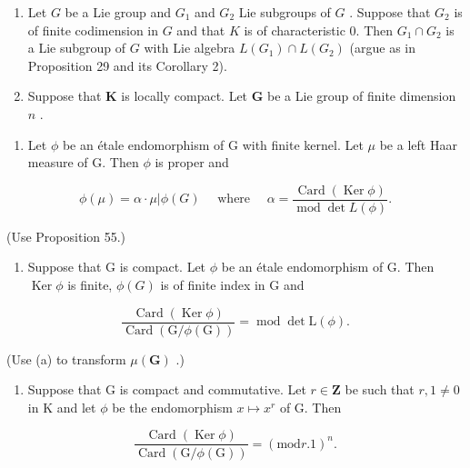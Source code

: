 
\begin{enumerate}
\def\labelenumi{\arabic{enumi}.}
\item
  Let \(G\) be a Lie group and \(G_1\) and \(G_2\) Lie subgroups of \(G\) . Suppose that \(G_2\) is of finite codimension in \(G\) and that \(K\) is of characteristic 0. Then \(G_1 \cap G_2\) is a Lie subgroup of \(G\) with Lie algebra \(L(G_1) \cap L(G_2)\) (argue as in Proposition 29 and its Corollary 2).
\item
  Suppose that \(\mathbf{K}\) is locally compact. Let \(\mathbf{G}\) be a Lie group of finite dimension \(n\) .
\end{enumerate}

\begin{enumerate}
\def\labelenumi{(\alph{enumi})}
\tightlist
\item
  Let \(\phi\) be an étale endomorphism of G with finite kernel. Let \(\mu\) be a left Haar measure of G. Then \(\phi\) is proper and
\end{enumerate}

\[
\phi (\mu) = \alpha \cdot \mu | \phi (G) \quad \text { where } \quad \alpha = \frac {\operatorname{Card} (\operatorname{Ker} \phi)}{\operatorname{mod} \det L (\phi)}.
\]

(Use Proposition 55.)
\relax{}
\begin{enumerate}
\def\labelenumi{(\alph{enumi})}
\setcounter{enumi}{1}
\tightlist
\item
  Suppose that G is compact. Let \(\phi\) be an étale endomorphism of G. Then \(\operatorname{Ker} \phi\) is finite, \(\phi(G)\) is of finite index in G and
\end{enumerate}

\[
\frac {\operatorname{Card} (\operatorname{Ker} \phi)}{\operatorname{Card} (\mathrm{G} / \phi (\mathrm{G}))} = \operatorname{mod} \det \mathrm{L} (\phi).
\]

(Use (a) to transform \(\mu (\mathbf{G})\) .)

\begin{enumerate}
\def\labelenumi{(\alph{enumi})}
\setcounter{enumi}{2}
\tightlist
\item
  Suppose that G is compact and commutative. Let \(r \in \mathbf{Z}\) be such that \(r, 1 \neq 0\) in K and let \(\phi\) be the endomorphism \(x \mapsto x^r\) of G. Then
\end{enumerate}

\[
\frac {\operatorname{Card} (\operatorname{Ker} \phi)}{\operatorname{Card} (\mathrm{G} / \phi (\mathrm{G}))} = (\mathrm{mod} r. 1) ^ {n}.
\]

